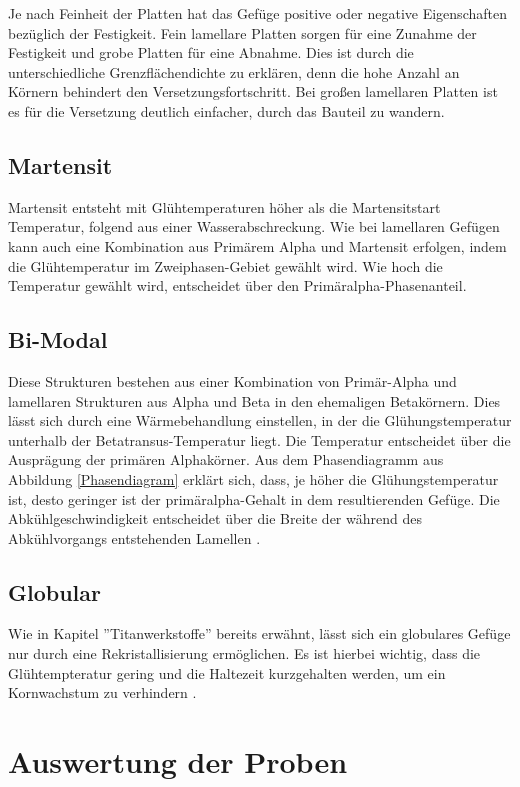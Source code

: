 \documentclass[a4paper, 11pt]{tubsreprt}
\begin{document}
Je nach Feinheit der Platten hat das Gefüge positive oder negative Eigenschaften bezüglich der Festigkeit. Fein lamellare Platten sorgen für eine Zunahme der Festigkeit und grobe Platten für eine Abnahme. Dies ist durch die unterschiedliche Grenzflächendichte zu erklären, denn die hohe Anzahl an Körnern behindert den Versetzungsfortschritt. Bei großen lamellaren Platten ist es für die Versetzung deutlich einfacher, durch das Bauteil zu wandern. 

\subsection{Martensit}
Martensit entsteht mit Glühtemperaturen höher als die Martensitstart  Temperatur, folgend aus einer Wasserabschreckung. Wie bei lamellaren Gefügen kann auch eine Kombination aus Primärem Alpha und Martensit erfolgen, indem die Glühtemperatur im Zweiphasen-Gebiet gewählt wird. Wie hoch die Temperatur gewählt wird, entscheidet über den Primäralpha-Phasenanteil.

\subsection{Bi-Modal}
Diese Strukturen bestehen aus einer Kombination von Primär-Alpha und lamellaren Strukturen aus Alpha und Beta in den ehemaligen Betakörnern. Dies lässt sich durch eine Wärmebehandlung einstellen, in der die Glühungstemperatur unterhalb der Betatransus-Temperatur liegt. Die Temperatur entscheidet über die Ausprägung der primären Alphakörner. Aus dem Phasendiagramm aus Abbildung \ref{Phasendiagram} erklärt sich, dass, je höher die Glühungstemperatur ist, desto geringer ist der primäralpha-Gehalt in dem resultierenden Gefüge. Die Abkühlgeschwindigkeit entscheidet über die Breite der während des Abkühlvorgangs entstehenden Lamellen \cite{Luetjering2007}.

\subsection{Globular}
Wie in Kapitel ''Titanwerkstoffe'' bereits erwähnt, lässt sich ein globulares Gefüge nur durch eine Rekristallisierung ermöglichen. Es ist hierbei wichtig, dass die Glühtempteratur gering und die Haltezeit kurzgehalten werden, um ein Kornwachstum zu verhindern \cite{Luetjering2007}.



\section{Auswertung der Proben}
\end{document}
